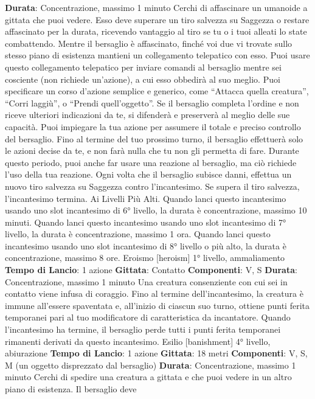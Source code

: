 \begin{multicols}{2}
\textbf{Durata}: Concentrazione, massimo 1 minuto
Cerchi di affascinare un umanoide a gittata che puoi
vedere. Esso deve superare un tiro salvezza su
Saggezza o restare affascinato per la durata, ricevendo
vantaggio al tiro se tu o i tuoi alleati lo state
combattendo.
Mentre il bersaglio è affascinato, finché voi due vi
trovate sullo stesso piano di esistenza mantieni un
collegamento telepatico con esso. Puoi usare questo
collegamento telepatico per inviare comandi al
bersaglio mentre sei cosciente (non richiede un’azione),
a cui esso obbedirà al suo meglio. Puoi specificare un
corso d’azione semplice e generico, come “Attacca
quella creatura”, “Corri laggiù”, o “Prendi quell’oggetto”.
Se il bersaglio completa l’ordine e non riceve ulteriori
indicazioni da te, si difenderà e preserverà al meglio
delle sue capacità.
Puoi impiegare la tua azione per assumere il totale e
preciso controllo del bersaglio. Fino al termine del tuo
prossimo turno, il bersaglio effettuerà solo le azioni
decise da te, e non farà nulla che tu non gli permetta di
fare. Durante questo periodo, puoi anche far usare una
reazione al bersaglio, ma ciò richiede l’uso della tua
reazione.
Ogni volta che il bersaglio subisce danni, effettua un
nuovo tiro salvezza su Saggezza contro l’incantesimo.
Se supera il tiro salvezza, l’incantesimo termina.
Ai Livelli Più Alti. Quando lanci questo incantesimo
usando uno slot incantesimo di 6° livello, la durata è
concentrazione, massimo 10 minuti. Quando lanci
questo incantesimo usando uno slot incantesimo di 7°
livello, la durata è concentrazione, massimo 1 ora.
Quando lanci questo incantesimo usando uno slot
incantesimo di 8° livello o più alto, la durata è
concentrazione, massimo 8 ore.
Eroismo
[heroism]
1° livello, ammaliamento
\textbf{Tempo di Lancio}: 1 azione
\textbf{Gittata}: Contatto
\textbf{Componenti}: V, S
\textbf{Durata}: Concentrazione, massimo 1 minuto
Una creatura consenziente con cui sei in contatto viene
infusa di coraggio. Fino al termine dell’incantesimo, la
creatura è immune all’essere spaventata e, all’inizio di
ciascun suo turno, ottiene punti ferita temporanei pari al
tuo modificatore di caratteristica da incantatore.
Quando l’incantesimo ha termine, il bersaglio perde tutti 
i punti ferita temporanei rimanenti derivati da questo
incantesimo.
Esilio
[banishment]
4° livello, abiurazione
\textbf{Tempo di Lancio}: 1 azione
\textbf{Gittata}: 18 metri
\textbf{Componenti}: V, S, M (un oggetto disprezzato dal
bersaglio)
\textbf{Durata}: Concentrazione, massimo 1 minuto
Cerchi di spedire una creatura a gittata e che puoi
vedere in un altro piano di esistenza. Il bersaglio deve

\end{multicols}
